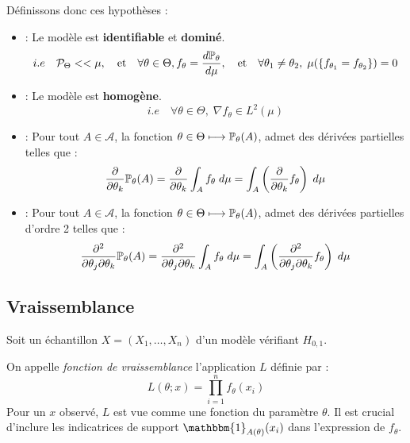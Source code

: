 \begin{definition}
    Définissons donc ces hypothèses : 
    \begin{itemize}
        \item[$(H_1)$] : Le modèle est \textbf{identifiable} et \textbf{dominé}. 
        $$ i.e \quad \mathcal{P}_\Theta << \mu, \quad \text{et} \quad \forall \theta \in \Theta, f_\theta = \frac{ d \mathbb{P}_\theta}{ d \mu}, 
        \quad \text{et} \quad \forall \theta_1 \not = \theta_2, \; \mu(\{f_{\theta_1} = f_{\theta_2}\}) = 0 
        $$
        \item[$(H_2)$] : Le modèle est \textbf{homogène}. 
        $$ 
            i.e \quad \forall \theta \in \Theta, \; \nabla f_\theta \in L^2( \mu)
        $$ 
        \item[$(H_3)$] : Pour tout $A \in \mathcal{A}$, la fonction $ \theta \in \Theta \longmapsto \mathbb{P}_\theta(A)$, admet des 
            dérivées partielles telles que : 
            $$ 
                \frac{ \partial}{ \partial \theta_k} \mathbb{P}_\theta(A) = \frac{ \partial}{ \partial \theta_k} \int_A f_\theta \; d \mu
                = \int_A \left( \frac{ \partial}{ \partial \theta_k} f_\theta \right) \;  d \mu 
            $$ 
        \item[$(H_4)$] : Pour tout $A \in \mathcal{A}$, la fonction $ \theta \in \Theta \longmapsto \mathbb{P}_\theta(A)$, admet des 
            dérivées partielles d'ordre 2 telles que : 
            $$ 
                \frac{ \partial^2}{ \partial \theta_j \partial \theta_k} \mathbb{P}_\theta(A) = \frac{ \partial^2}{ \partial \theta_j \partial \theta_k} \int_A f_\theta \; d \mu
                = \int_A \left( \frac{ \partial^2}{ \partial \theta_j \partial \theta_k} f_\theta \right) \;  d \mu 
            $$ 
    \end{itemize}
\end{definition}

\subsection{Vraissemblance}

Soit un échantillon ${X} = (X_1, \dots, X_n)$ d'un modèle vérifiant $H_{0,1}$.

\begin{definition}
    On appelle \emph{fonction de vraissemblance} l'application $L$ définie par : 
        $$ L(\theta; x) = \prod_{i=1}^{n} f_\theta(x_i) $$
    Pour un $x$ observé, $L$ est vue comme une fonction du paramètre $\theta$. Il est crucial d'inclure les 
    indicatrices de support $ \mathbbm{1}_{A(\theta)}(x_i)$ dans l'expression de $f_\theta$.
\end{definition}

